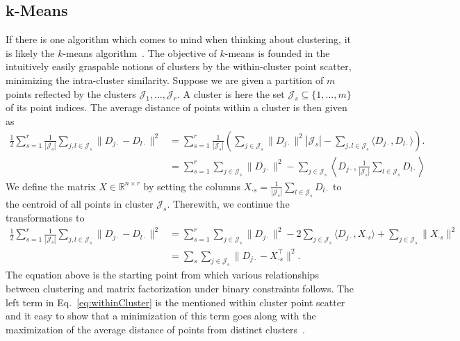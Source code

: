 \subsection{k-Means}\label{sec:ZS:kmeans}
If there is one algorithm which comes to mind when thinking about clustering, it is likely the $k$-means algorithm~\citep{lloyd1982least}. The objective of $k$-means is founded in the intuitively easily graspable notions of clusters by the within-cluster point scatter, minimizing the intra-cluster similarity.
Suppose we are given a partition of $m$ points reflected by the clusters $\mathcal{J}_1,\ldots, \mathcal{J}_r$. A cluster is here the set $\mathcal{J}_s\subseteq \{1,\ldots, m\}$ of its point indices. The average distance of points within a cluster is then given as
\begin{align*}
\frac{1}{2}\sum_{s=1}^r\frac{1}{|\mathcal{J}_s|}\sum_{j,l\in \mathcal{J}_s} \|D_{j\cdot}-D_{l\cdot}\|^2 
&= \sum_{s=1}^r \frac{1}{|\mathcal{J}_s|}\left(\sum_{j\in \mathcal{J}_s} \|D_{j\cdot}\|^2|\mathcal{J}_s| - \sum_{j,l\in \mathcal{J}_s}\langle D_{j\cdot},D_{l\cdot}\rangle\right).\\
&= \sum_{s=1}^r \sum_{j\in \mathcal{J}_s} \|D_{j\cdot }\|^2 -\sum_{j\in \mathcal{J}_s}\left\langle D_{j\cdot},\frac{1}{|\mathcal{J}_s|}\sum_{l\in\mathcal{J}_s}D_{l\cdot}\right\rangle
\end{align*}
We define the matrix $X\in\mathbb{R}^{n\times r}$ by setting the columns $X_{\cdot s}=\frac{1}{|\mathcal{J}_s|}\sum_{l\in\mathcal{J}_s}D_{l\cdot}$ to the centroid of all points in cluster $\mathcal{J}_s$. Therewith, we continue the transformations to
\begin{align}
\frac{1}{2}\sum_{s=1}^r\frac{1}{|\mathcal{J}_s|}\sum_{j,l\in \mathcal{J}_s} \|D_{j\cdot}-D_{l\cdot}\|^2 
&= \sum_{s=1}^r \sum_{j\in \mathcal{J}_s} \|D_{j\cdot }\|^2 -2\sum_{j\in \mathcal{J}_s}\langle D_{j\cdot},X_{\cdot s}\rangle +\sum_{j\in \mathcal{J}_s}\|X_{\cdot s}\|^2 \label{eq:withinCluster}\\
&= \sum_s \sum_{j\in \mathcal{J}_s} \|D_{j\cdot} -X_{\cdot s}^\top\|^2.\nonumber
\end{align}
The equation above is the starting point from which various relationships between clustering and matrix factorization under binary constraints follows. The left term in Eq.~\eqref{eq:withinCluster} is the mentioned within cluster point scatter and it easy to show that a minimization of this term goes along with the maximization of the average distance of points from distinct clusters~\citep{friedman2001elements}. 

